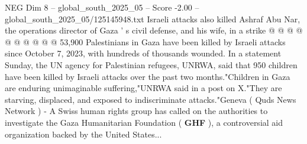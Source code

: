\begin{textsample}{NEG Dim 8 – global\_south\_2025\_05 – Score -2.00 – global\_south\_2025\_05/125145948.txt}
Israeli attacks also killed Ashraf Abu Nar, the operations director of Gaza ' s civil defense, and his wife, in a strike @ @ @ @ @ @ @ @ @ @ 53,900 Palestinians in Gaza have been killed by Israeli attacks since October 7, 2023, with hundreds of thousands wounded.
In a statement Sunday, the UN agency for Palestinian refugees, UNRWA, said that 950 children have been killed by Israeli attacks over the past two months."Children in Gaza are enduring unimaginable suffering,"UNRWA said in a post on X."They are starving, displaced, and exposed to indiscriminate attacks."Geneva ( Quds News Network ) - A Swiss human rights group has called on the authorities to investigate the Gaza Humanitarian Foundation ( \textbf{GHF} ), a controversial aid organization backed by the United States...

\end{textsample}

